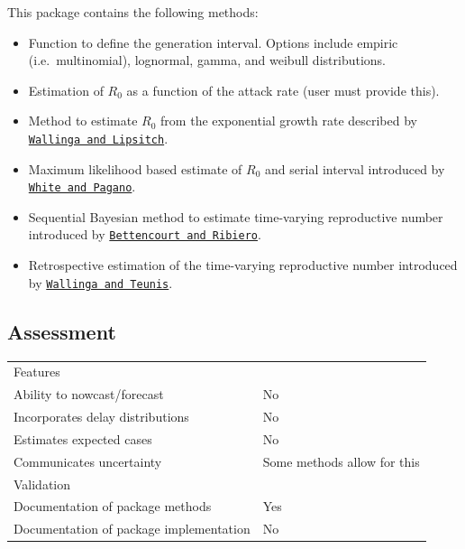 \documentclass[
  letterpaper,
  DIV=11,
  numbers=noendperiod]{scrreprt}
\providecommand{\tightlist}{%
  \setlength{\itemsep}{0pt}\setlength{\parskip}{0pt}}\usepackage{longtable,booktabs,array}
\begin{document}
This package contains the following methods:

\begin{itemize}
\tightlist
\item
  Function to define the generation interval. Options include empiric
  (i.e.~multinomial), lognormal, gamma, and weibull distributions.
\item
  Estimation of \(R_0\) as a function of the attack rate (user must
  provide this).
\item
  Method to estimate \(R_0\) from the exponential growth rate described
  by
  \href{https://pubmed.ncbi.nlm.nih.gov/17476782/}{\texttt{Wallinga\ and\ Lipsitch}}.
\item
  Maximum likelihood based estimate of \(R_0\) and serial interval
  introduced by
  \href{https://pubmed.ncbi.nlm.nih.gov/18058829/}{\texttt{White\ and\ Pagano}}.
\item
  Sequential Bayesian method to estimate time-varying reproductive
  number introduced by
  \href{https://pubmed.ncbi.nlm.nih.gov/18478118/}{\texttt{Bettencourt\ and\ Ribiero}}.
\item
  Retrospective estimation of the time-varying reproductive number
  introduced by
  \href{https://pubmed.ncbi.nlm.nih.gov/15353409/}{\texttt{Wallinga\ and\ Teunis}}.
\end{itemize}

\subsection*{Assessment}\label{assessment-12}

\begin{longtable}[]{@{}
  >{\raggedright\arraybackslash}p{}
  >{\raggedright\arraybackslash}p{}@{}}
\toprule\noalign{}
\endhead
\bottomrule\noalign{}
\endlastfoot
Features & \\
Ability to nowcast/forecast & No \\
Incorporates delay distributions & No \\
Estimates expected cases & No \\
Communicates uncertainty & Some methods allow for this \\
Validation & \\
Documentation of package methods & Yes \\
Documentation of package implementation & No \\
\end{longtable}
\end{document}
